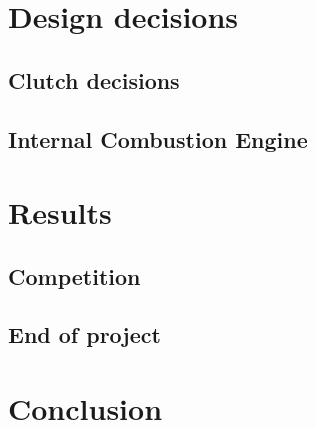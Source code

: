 \section{Design decisions}
\subsection{Clutch decisions}

\subsection{Internal Combustion Engine}

\section{Results}
\subsection{Competition}

\subsection{End of project}

\section{Conclusion}